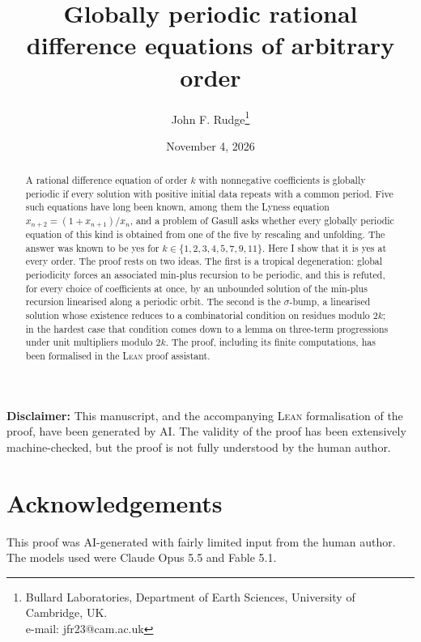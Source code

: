 \documentclass[11pt]{article}
\title{Globally periodic rational difference equations of arbitrary order}
\author{John F. Rudge\thanks{Bullard Laboratories, Department of Earth
Sciences, University of Cambridge, UK.\\e-mail: jfr23@cam.ac.uk}}
\date{November 4, 2026}
\theoremstyle{definition}
\theoremstyle{remark}
\begin{document}
\maketitle

\begin{abstract}
A rational difference equation of order $k$ with nonnegative coefficients
is globally periodic if every solution with positive initial data repeats
with a common period. Five such equations have long been known, among them
the Lyness equation $x_{n+2}=(1+x_{n+1})/x_n$, and a problem of Gasull asks
whether every globally periodic equation of this kind is obtained from one
of the five by rescaling and unfolding. The answer was known to be yes for
$k\in\{1,2,3,4,5,7,9,11\}$. Here I show that it is yes at every order. The
proof rests on two ideas. The first is a tropical degeneration: global
periodicity forces an associated min-plus recursion to be periodic, and
this is refuted, for every choice of coefficients at once, by an unbounded
solution of the min-plus recursion linearised along a periodic orbit. The
second is the $\sigma$-bump, a linearised solution whose existence reduces
to a combinatorial condition on residues modulo $2k$; in the hardest case
that condition comes down to a lemma on three-term progressions under unit
multipliers modulo $2k$. The proof, including its finite computations, has
been formalised in the \textsc{Lean} proof assistant.
\end{abstract}

\noindent\textbf{Disclaimer:} This manuscript, and the accompanying
\textsc{Lean} formalisation of the proof, have been generated by AI. The
validity of the proof has been extensively machine-checked, but the proof is
not fully understood by the human author.












\section*{Acknowledgements}

This proof was AI-generated with fairly limited input from the human author. 
The models used were Claude Opus 5.5 and Fable 5.1.

\appendix






\end{document}

